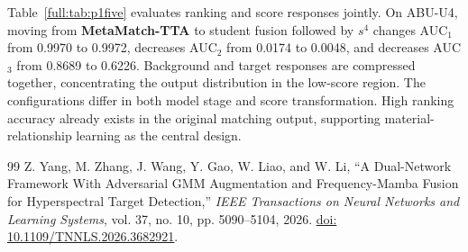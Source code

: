 \documentclass[a4paper,11pt]{article}
\newcommand{\method}{\textbf{MetaMatch-TTA}}
\begin{document}
Table~\ref{full:tab:p1five} evaluates ranking and score responses jointly. On ABU-U4, moving from \method{} to student fusion followed by $s^4$ changes AUC$_1$ from 0.9970 to 0.9972, decreases AUC$_2$ from 0.0174 to 0.0048, and decreases AUC$_3$ from 0.8689 to 0.6226. Background and target responses are compressed together, concentrating the output distribution in the low-score region. The configurations differ in both model stage and score transformation. High ranking accuracy already exists in the original matching output, supporting material-relationship learning as the central design.






\FloatBarrier


\FloatBarrier
\begingroup\footnotesize
\begin{thebibliography}{99}
 Z. Yang, M. Zhang, J. Wang, Y. Gao, W. Liao, and W. Li, ``A Dual-Network Framework With Adversarial GMM Augmentation and Frequency-Mamba Fusion for Hyperspectral Target Detection,'' \emph{IEEE Transactions on Neural Networks and Learning Systems}, vol. 37, no. 10, pp. 5090--5104, 2026. \href{https://doi.org/10.1109/TNNLS.2026.3682921}{doi: 10.1109/TNNLS.2026.3682921}.
\end{thebibliography}
\endgroup
\end{document}
